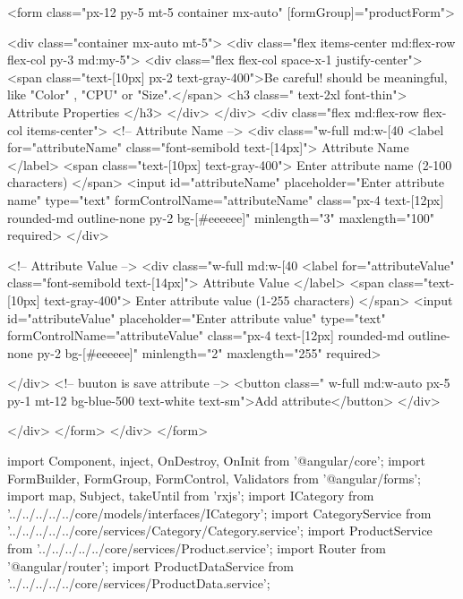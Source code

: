 <form class="px-12 py-5 mt-5 container mx-auto" [formGroup]="productForm">
	
	<div class="container mx-auto mt-5">
		<div class="flex items-center md:flex-row flex-col py-3 md:my-5">
			<div class="flex flex-col space-x-1 justify-center">
				<span class="text-[10px] px-2 text-gray-400">Be careful! should be meaningful, like "Color" , "CPU" or
					"Size".</span>
				<h3 class=" text-2xl font-thin">
					Attribute Properties
				</h3>
			</div>
		</div>
		<div class="flex md:flex-row flex-col items-center">
			<!-- Attribute Name -->
			<div class="w-full md:w-[40%
				<label for="attributeName" class="font-semibold text-[14px]">
					Attribute Name
				</label>
				<span class="text-[10px] text-gray-400">
					Enter attribute name (2-100 characters)
				</span>
				<input id="attributeName" placeholder="Enter attribute name" type="text" formControlName="attributeName"
					class="px-4 text-[12px] rounded-md outline-none py-2 bg-[#eeeeee]" minlength="3" maxlength="100"
					required>
			</div>


			<!-- Attribute Value -->
			<div class="w-full md:w-[40%
				<label for="attributeValue" class="font-semibold text-[14px]">
					Attribute Value
				</label>
				<span class="text-[10px] text-gray-400">
					Enter attribute value (1-255 characters)
				</span>
				<input id="attributeValue" placeholder="Enter attribute value" type="text"
					formControlName="attributeValue" class="px-4 text-[12px] rounded-md outline-none py-2 bg-[#eeeeee]"
					minlength="2" maxlength="255" required>
          
			</div>
			<!-- buuton is save attribute -->
			<button  class=" w-full md:w-auto px-5 py-1  mt-12 bg-blue-500 text-white text-sm">Add attribute</button>
		</div>

	</div>
</form>
    </div>
  </form>









  import { Component, inject, OnDestroy, OnInit } from '@angular/core';
import { FormBuilder, FormGroup, FormControl, Validators } from '@angular/forms';
import { map, Subject, takeUntil } from 'rxjs';
import { ICategory } from '../../../../../core/models/interfaces/ICategory';
import { CategoryService } from '../../../../../core/services/Category/Category.service';
import { ProductService } from '../../../../../core/services/Product.service';
import { Router } from '@angular/router';
import { ProductDataService } from '../../../../../core/services/ProductData.service';

